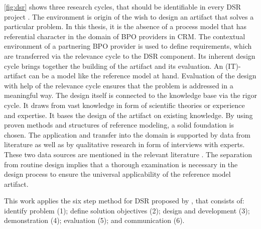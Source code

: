 \Fig \ref{fig:dsr} shows three research cycles, that should be identifiable in every \acrshort{DSR} project \citep{Hevner2010}. The environment is origin of the wish to design an artifact that solves a particular problem. In this thesis, it is the absence of a process model that has referential character in the domain of \acrshort{BPO} providers in \acrshort{CRM}. The contextual environment of a partnering  \acrshort{BPO} provider is used to define requirements, which are transferred via the relevance cycle to the \acrshort{DSR} component. Its inherent design cycle brings together the building of the artifact and its evaluation. An (IT)-artifact can be a model \citep{Hevner2010} like the reference model at hand. Evaluation of the design with help of the relevance cycle ensures that the problem is addressed in a meaningful way. The design itself is connected to the knowledge base via the rigor cycle. It draws from vast knowledge in form of scientific theories or experience and expertise. It bases the design of the artifact on existing knowledge. By using proven methods and structures of reference modeling, a solid foundation is chosen. The application and transfer into the domain is supported by data from literature as well as by qualitative research in form of interviews with experts. These two data sources are mentioned in the relevant literature \citep[]{thomas2006mang}. The separation from routine design implies that a thorough examination is necessary in the design process to ensure the universal applicability of the reference model artifact. 

This work applies the six step method for \acrshort{DSR} proposed by \citep{Hevner2004,Peffers2007}, that consists of: identify problem (1); define solution objectives (2); design and development (3); demonstration (4); evaluation (5); and communication (6). 





